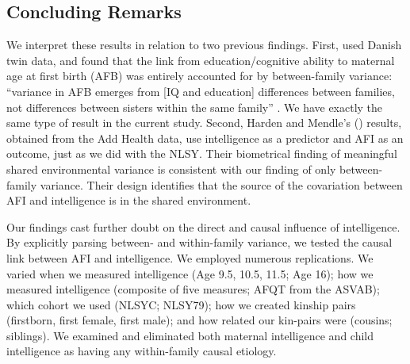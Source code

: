 \documentclass[a4paper,man,apacite,natbib,12pt,longtable]{apa6}\usepackage[]{graphicx}\usepackage[]{color}
\begin{document}
\subsection{Concluding Remarks} We interpret these results in relation to two previous findings. First, \citet{Rodgers2008AJS} used Danish twin data, and found that the link from education/cognitive ability to maternal age at first birth (AFB) was entirely accounted for by between-family variance: ``variance in AFB emerges from [IQ and education] differences between families, not differences between sisters within the same family'' \citep[][p. 202]{Rodgers2008AJS}. We have exactly the same type of result in the current study. Second, Harden and Mendle's (\citeyear{harden2011don}) results, obtained from the Add Health data, use intelligence as a predictor and AFI as an outcome, just as we did with the NLSY. Their biometrical finding of meaningful shared environmental variance is consistent with our finding of only between-family variance. Their design identifies that the source of the covariation between AFI and intelligence is in the shared environment.

Our findings cast further doubt on the direct and causal influence of intelligence. By explicitly parsing between- and within-family variance, we tested the causal link between AFI and intelligence. We employed numerous replications. We varied when we measured intelligence (Age 9.5, 10.5, 11.5; Age 16); how we measured intelligence (composite of five measures; AFQT from the ASVAB); which cohort we used (NLSYC; NLSY79); how we created kinship pairs (firstborn, first female, first male); and how related our kin-pairs were (cousins; siblings). We examined and eliminated both maternal intelligence and child intelligence as having any within-family causal etiology.
\end{document}
